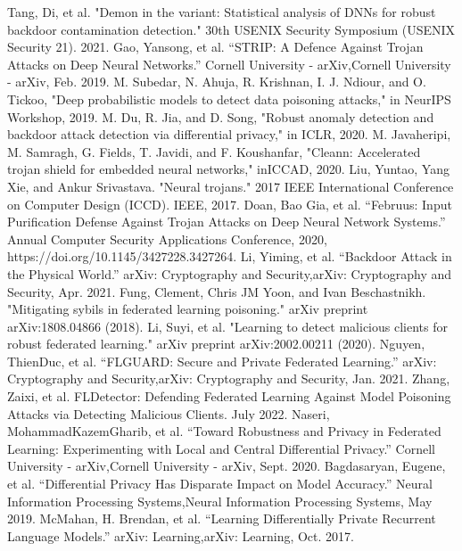 \documentclass[conference]{IEEEtran}
\begin{document}
\begin{thebibliography}{00}
     Tang, Di, et al. "Demon in the variant: Statistical analysis of {DNNs} for robust backdoor contamination detection." 30th USENIX Security Symposium (USENIX Security 21). 2021.
     Gao, Yansong, et al. “STRIP: A Defence Against Trojan Attacks on Deep Neural Networks.” Cornell University - arXiv,Cornell University - arXiv, Feb. 2019.
     M. Subedar, N. Ahuja, R. Krishnan, I. J. Ndiour, and O. Tickoo, "Deep probabilistic models to detect data poisoning attacks," in NeurIPS Workshop, 2019.
     M. Du, R. Jia, and D. Song, "Robust anomaly detection and backdoor attack detection via differential privacy," in ICLR, 2020.
     M. Javaheripi, M. Samragh, G. Fields, T. Javidi, and F. Koushanfar, "Cleann: Accelerated trojan shield for embedded neural networks," inICCAD, 2020.
     Liu, Yuntao, Yang Xie, and Ankur Srivastava. "Neural trojans." 2017 IEEE International Conference on Computer Design (ICCD). IEEE, 2017.
     Doan, Bao Gia, et al. “Februus: Input Purification Defense Against Trojan Attacks on Deep Neural Network Systems.” Annual Computer Security Applications Conference, 2020, https://doi.org/10.1145/3427228.3427264.
     Li, Yiming, et al. “Backdoor Attack in the Physical World.” arXiv: Cryptography and Security,arXiv: Cryptography and Security, Apr. 2021.  
     Fung, Clement, Chris JM Yoon, and Ivan Beschastnikh. "Mitigating sybils in federated learning poisoning." arXiv preprint arXiv:1808.04866 (2018).  
     Li, Suyi, et al. "Learning to detect malicious clients for robust federated learning." arXiv preprint arXiv:2002.00211 (2020).  
     Nguyen, ThienDuc, et al. “FLGUARD: Secure and Private Federated Learning.” arXiv: Cryptography and Security,arXiv: Cryptography and Security, Jan. 2021.  
     Zhang, Zaixi, et al. FLDetector: Defending Federated Learning Against Model Poisoning Attacks via Detecting Malicious Clients. July 2022. 
     Naseri, MohammadKazemGharib, et al. “Toward Robustness and Privacy in Federated Learning: Experimenting with Local and Central Differential Privacy.” Cornell University - arXiv,Cornell University - arXiv, Sept. 2020.
     Bagdasaryan, Eugene, et al. “Differential Privacy Has Disparate Impact on Model Accuracy.” Neural Information Processing Systems,Neural Information Processing Systems, May 2019.   
     McMahan, H. Brendan, et al. “Learning Differentially Private Recurrent Language Models.” arXiv: Learning,arXiv: Learning, Oct. 2017.  

\end{thebibliography}
\end{document}
